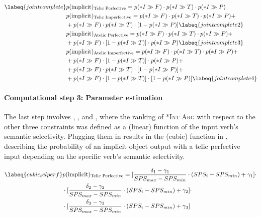 \begin{align}  \labeq{jointcomplete}
    & p(\text{implicit})\textsubscript{Telic Perfective} = p(*I \gg F) \cdot p(*I \gg T) \cdot p(*I \gg P) \\
    & p(\text{implicit})\textsubscript{Telic Imperfective} = p(*I \gg F) \cdot p(*I \gg T) \cdot p(*I \gg P) + \nonumber \\ & + p(*I \gg F) \cdot p(*I \gg T) \cdot [1 - p(*I \gg P)] \labeq{jointcomplete2}\\
    & p(\text{implicit})\textsubscript{Atelic Perfective} = p(*I \gg F) \cdot p(*I \gg T) \cdot p(*I \gg P) + \nonumber \\ & + p(*I \gg F) \cdot [1 - p(*I \gg T)] \cdot p(*I \gg P) \labeq{jointcomplete3}\\
    & p(\text{implicit})\textsubscript{Atelic Imperfective} = p(*I \gg F) \cdot p(*I \gg T) \cdot p(*I \gg P) + \nonumber \\ & + p(*I \gg F) \cdot [1 - p(*I \gg T)] \cdot p(*I \gg P) + \nonumber \\ & + p(*I \gg F) \cdot p(*I \gg T) \cdot [1 - p(*I \gg P)] + \nonumber \\ & + p(*I \gg F) \cdot [1 - p(*I \gg T)] \cdot [1 - p(*I \gg P)] \labeq{jointcomplete4}
\end{align}

\paragraph{Computational step 3: Parameter estimation} The last step involves , , and , where the ranking of \textsc{*Int Arg} with respect to the other three constraints was defined as a (linear) function of the input verb's semantic selectivity. Plugging them in  results in the (cubic) function in , describing the probability of an implicit object output with a telic perfective input depending on the specific verb's semantic selectivity.

\begin{align}  \labeq{cubic_telperf}
    & p(\text{implicit})\textsubscript{Telic Perfective} = [\frac{\delta_1 - \gamma_1}{SPS_{max} - SPS_{min}} \cdot ({SPS_{i} - SPS_{min}}) + \gamma_1] \cdot \nonumber \\ & \cdot [\frac{\delta_2 - \gamma_2}{SPS_{max} - SPS_{min}} \cdot ({SPS_{i} - SPS_{min}}) + \gamma_2] \cdot \nonumber \\ & \cdot [\frac{\delta_3 - \gamma_3}{SPS_{max} - SPS_{min}} \cdot ({SPS_{i} - SPS_{min}}) + \gamma_3]
\end{align}

